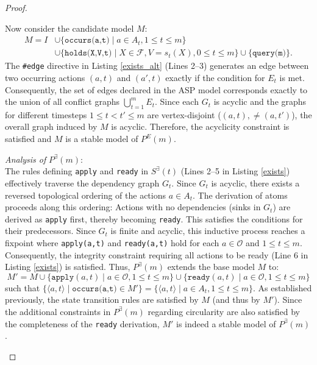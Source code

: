 \documentclass[
     11pt,                    %
     a4paper,             %
     BCOR=10mm,     %
     DIV=14,                 %
     listof=totoc,                    %
     bibliography=totoc,       %
     index=totoc,              %
     parskip            %
     twoside,
     headsepline
     ]{scrreprt}
\theoremstyle{definition}
\theoremstyle{definition}
\theoremstyle{remark}
\theoremstyle{bfnote}
\begin{document}
\begin{proof}
\begin{itemize}
      Now consider the candidate model $M$:
      \begin{align*}
        M = I &\cup \{\texttt{occurs(a,t)} \mid a \in A_t, 1 \le t \le m \} \\
              &\cup \{\texttt{holds(X,V,t)} \mid X \in \mathcal F, V=s_t(X), 0 \le t \le m\} \cup \{\texttt{query(m)}\}.
      \end{align*}
      The \texttt{\#edge} directive in Listing \ref{exists_alt} (Lines 2--3) generates an edge between two occurring actions $(a,t)$ and $(a',t)$ exactly if the condition for $E_t$ is met. Consequently, the set of edges declared in the ASP model corresponds exactly to the union of all conflict graphs $\bigcup_{t=1}^m E_t$.
      Since each $G_t$ is acyclic and the graphs for different timesteps $1 \le t < t' \le m$ are vertex-disjoint ($(a,t), \ne (a, t')$), the overall graph induced by $M$ is acyclic.
      Therefore, the acyclicity constraint is satisfied and $M$ is a stable model of $P^E(m)$. \vspace{0.5em}

      \textit{Analysis of }$P^\exists(m)$: \\
      The rules defining \texttt{apply} and \texttt{ready} in $S^\exists(t)$ (Lines 2--5 in Listing \ref{exists}) effectively traverse the dependency graph $G_t$.
      Since $G_t$ is acyclic, there exists a reversed topological ordering of the actions $a \in A_t$. The derivation of atoms proceeds along this ordering: Actions with no dependencies (sinks in $G_t$) are derived as \texttt{apply} first, thereby becoming \texttt{ready}. This satisfies the conditions for their predecessors. 
      Since $G_t$ is finite and acyclic, this inductive process reaches a fixpoint where \texttt{apply(a,t)} and \texttt{ready(a,t)} hold for each $a \in \mathcal O$ and $1 \le t \le m$.
      Consequently, the integrity constraint requiring all actions to be ready (Line 6 in Listing \ref{exists}) is satisfied.
      Thus, $P^\exists(m)$ extends the base model $M$ to:
      \[
        M' = M \cup \{\texttt{apply}(a,t) \mid a \in \mathcal O, 1 \le t \le m\} \cup \{\texttt{ready}(a,t) \mid a \in \mathcal O, 1 \le t \le m \}
      \]
      such that $\{\langle a, t \rangle \mid \texttt{occurs(a,t)} \in M'\} = \{\langle a, t \rangle \mid a \in A_t, 1 \le t \le m \}$.
      As established previously, the state transition rules are satisfied by $M$ (and thus by $M'$). Since the additional constraints in $P^\exists(m)$ regarding circularity are also satisfied by the completeness of the \texttt{ready} derivation, $M'$ is indeed a stable model of $P^\exists(m)$. \\


\end{itemize}
\end{proof}
\end{document}
